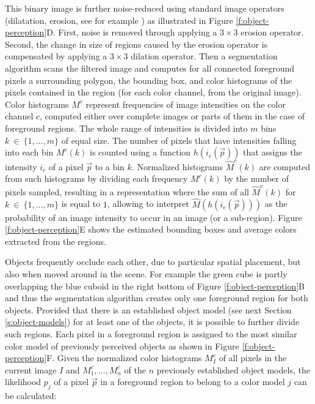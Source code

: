 This binary image is further noise-reduced using standard image
operators (dilatation, erosion, see for example
\citealp{parker96algorithms,soille02morphological}) as illustrated in
Figure \ref{f:object-perception}D. First, noise is removed through
applying a $3\times 3$ erosion operator. Second, the change in size of
regions caused by the erosion operator is compensated by applying a
$3\times 3$ dilation operator. Then a segmentation algorithm scans the
filtered image and computes for all connected foreground pixels a
surrounding polygon, the bounding box, and color histograms of the
pixels contained in the region (for each color channel, from the
original image). Color histograms $M^c$ represent frequencies of image
intensities on the color channel $c$, computed either over complete
images or parts of them in the case of foreground regions. The whole
range of intensities is divided into $m$ bins $k~\in~\{1,\dots,m\}$ of
equal size. The number of pixels that have intensities falling into
each bin $M^c(k)$ is counted using a function $h(i_{c}(\vec{p}))$ that
assigns the intensity $i_c$ of a pixel $\vec{p}$ to a bin
$k$. Normalized histograms $\hat{M}^c(k)$ are computed from such
histograms by dividing each frequency $M^c(k)$ by the number of pixels
sampled, resulting in a representation where the sum of all
$\hat{M}^c(k)$ for $k~\in~\{1,\dots,m\}$ is equal to $1$, allowing to
interpret $\hat{M}(h(i_c(\vec{p})))$ as the probability of an image
intensity to occur in an image (or a sub-region). Figure
\ref{f:object-perception}E shows the estimated bounding boxes and
average colors extracted from the regions.



Objects frequently occlude each other, due to particular spatial
placement, but also when moved around in the scene.  For example the
green cube is partly overlapping the blue cuboid in the right bottom
of Figure \ref{f:object-perception}B and thus the segmentation
algorithm creates only one foreground region for both
objects. Provided that there is an established object model (see next
Section \ref{s:object-models}) for at least one of the objects, it is
possible to further divide such regions. Each pixel in a foreground
region is assigned to the most similar color model of previously
perceived objects as shown in Figure \ref{f:object-perception}F. Given
the normalized color histograms $M_I^c$ of all pixels in the current
image $I$ and $M_1^c,\dots,M_n^c$ of the $n$ previously established
object models, the likelihood $p_j$ of a pixel $\vec{p}$ in a
foreground region to belong to a color model $j$ can be calculated:

